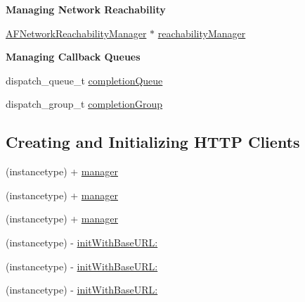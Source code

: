 \begin{Indent}\textbf{ Managing Network Reachability}\par
{\em 

 

 }\begin{DoxyCompactItemize}
\item 
\mbox{\hyperlink{interface_a_f_network_reachability_manager}{A\+F\+Network\+Reachability\+Manager}} $\ast$ \mbox{\hyperlink{interface_a_f_h_t_t_p_request_operation_manager_ad4de2e908d6eba884e0bafdff2dfc67c}{reachability\+Manager}}
\end{DoxyCompactItemize}
\end{Indent}
\begin{Indent}\textbf{ Managing Callback Queues}\par
{\em 

 

 }\begin{DoxyCompactItemize}
\item 
dispatch\+\_\+queue\+\_\+t \mbox{\hyperlink{interface_a_f_h_t_t_p_request_operation_manager_af1b09e063908143fda4bb0b0b176908d}{completion\+Queue}}
\item 
dispatch\+\_\+group\+\_\+t \mbox{\hyperlink{interface_a_f_h_t_t_p_request_operation_manager_a82471e7500e97f86cec41fce3fc43347}{completion\+Group}}
\end{DoxyCompactItemize}
\end{Indent}
\subsection*{Creating and Initializing H\+T\+TP Clients}
\label{_amgrp73a7335449da7adff927a7dcf1e747d6}%


 

 \begin{DoxyCompactItemize}
\item 
(instancetype) + \mbox{\hyperlink{interface_a_f_h_t_t_p_request_operation_manager_a754dc33037c729c5ef6a34b12de6884a}{manager}}
\item 
(instancetype) + \mbox{\hyperlink{interface_a_f_h_t_t_p_request_operation_manager_a754dc33037c729c5ef6a34b12de6884a}{manager}}
\item 
(instancetype) + \mbox{\hyperlink{interface_a_f_h_t_t_p_request_operation_manager_a754dc33037c729c5ef6a34b12de6884a}{manager}}
\item 
(instancetype) -\/ \mbox{\hyperlink{interface_a_f_h_t_t_p_request_operation_manager_ac9f2ccf8cfa05afbff8ad4fd2a900190}{init\+With\+Base\+U\+R\+L\+:}}
\item 
(instancetype) -\/ \mbox{\hyperlink{interface_a_f_h_t_t_p_request_operation_manager_ac9f2ccf8cfa05afbff8ad4fd2a900190}{init\+With\+Base\+U\+R\+L\+:}}
\item 
(instancetype) -\/ \mbox{\hyperlink{interface_a_f_h_t_t_p_request_operation_manager_ac9f2ccf8cfa05afbff8ad4fd2a900190}{init\+With\+Base\+U\+R\+L\+:}}
\end{DoxyCompactItemize}


